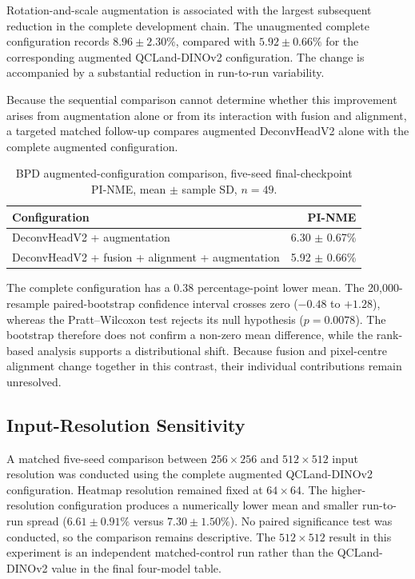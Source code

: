 Rotation-and-scale augmentation is associated with the largest
subsequent reduction in the complete development chain. The
unaugmented complete configuration records $8.96\pm2.30\%$, compared
with $5.92\pm0.66\%$ for the corresponding augmented
QCLand-DINOv2 configuration. The change is accompanied by a
substantial reduction in run-to-run variability.

Because the sequential comparison cannot determine whether this
improvement arises from augmentation alone or from its interaction
with fusion and alignment, a targeted matched follow-up compares
augmented DeconvHeadV2 alone with the complete augmented
configuration.

\begin{table}[htbp]
  \centering
  \caption{BPD augmented-configuration comparison, five-seed
    final-checkpoint PI-NME, mean $\pm$ sample SD, $n=49$.}
  \label{tab:bpd-augmented}
  \begin{tabular}{@{}lr@{}}
    \toprule
    Configuration & PI-NME \\
    \midrule
    DeconvHeadV2 + augmentation
      & 6.30 $\pm$ 0.67\% \\
    DeconvHeadV2 + fusion + alignment + augmentation
      & 5.92 $\pm$ 0.66\% \\
    \bottomrule
  \end{tabular}
\end{table}

The complete configuration has a 0.38 percentage-point lower mean.
The 20{,}000-resample paired-bootstrap confidence interval crosses
zero ($-0.48$ to $+1.28$), whereas the Pratt--Wilcoxon test rejects
its null hypothesis ($p=0.0078$). The bootstrap therefore does not
confirm a non-zero mean difference, while the rank-based analysis
supports a distributional shift. Because fusion and pixel-centre
alignment change together in this contrast, their individual
contributions remain unresolved.


\subsection{Input-Resolution Sensitivity}
\label{sec:results-resolution}

A matched five-seed comparison between $256\times256$ and
$512\times512$ input resolution was conducted using the complete
augmented QCLand-DINOv2 configuration. Heatmap resolution remained
fixed at $64\times64$. The higher-resolution configuration produces a
numerically lower mean and smaller run-to-run spread
($6.61\pm0.91\%$ versus $7.30\pm1.50\%$). No paired significance
test was conducted, so the comparison remains descriptive. The
$512\times512$ result in this experiment is an independent
matched-control run rather than the QCLand-DINOv2 value in the final
four-model table.


